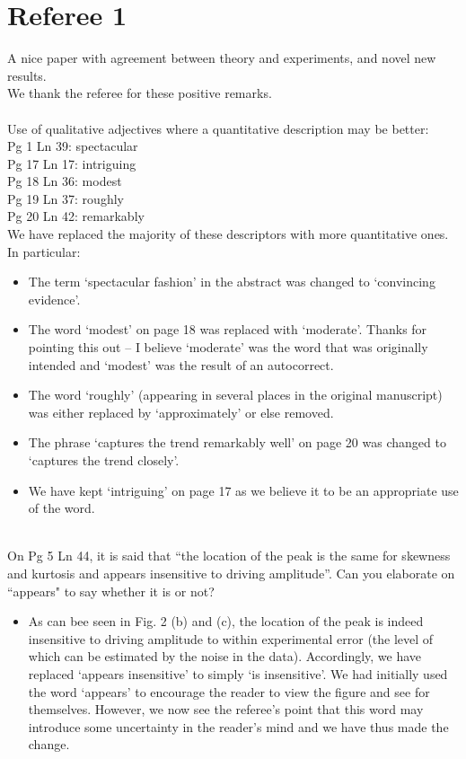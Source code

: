 \documentclass[11pt]{article}
\newcommand{\comment}[1]{{\color{blue} #1}}
\begin{document}
\section*{Referee 1}

\noindent
\comment{A nice paper with agreement between theory and experiments, and novel new results.} \\

\noindent
We thank the referee for these positive remarks. \\ \\

\noindent
\comment{
Use of qualitative adjectives where a quantitative description may be better: \\
Pg 1 Ln 39: spectacular \\
Pg 17 Ln 17: intriguing \\
Pg 18 Ln 36: modest \\
Pg 19 Ln 37: roughly \\
Pg 20 Ln 42: remarkably} \\

\noindent
We have replaced the majority of these descriptors with more quantitative ones. In particular:
\begin{itemize}
\item The term `spectacular fashion' in the abstract was changed to `convincing evidence'.
\item The word `modest' on page 18 was replaced with `moderate'. Thanks for pointing this out -- I believe `moderate' was the word that was originally intended and `modest' was the result of an autocorrect.
\item The word `roughly' (appearing in several places in the original manuscript) was either replaced by `approximately' or else removed.
\item The phrase `captures the trend remarkably well' on page 20 was changed to `captures the trend closely'.
\item We have kept `intriguing' on page 17 as we believe it to be an appropriate use of the word.
\end{itemize}
\hphantom \\

\noindent
\comment{On Pg 5 Ln 44, it is said that ``the location of the peak is the same for skewness and kurtosis and appears insensitive to driving amplitude''. Can you elaborate on ``appears" to say whether it is or not?}

\begin{itemize}
\item As can bee seen in Fig. 2 (b) and (c), the location of the peak is indeed insensitive to driving amplitude to within experimental error (the level of which can be estimated by the noise in the data). Accordingly, we have replaced `appears insensitive' to simply `is insensitive'.
We had initially used the word `appears' to encourage the reader to view the figure and see for themselves. However, we now see the referee's point that this word may introduce some uncertainty in the reader's mind and we have thus made the change.
\end{itemize}
\end{document}
